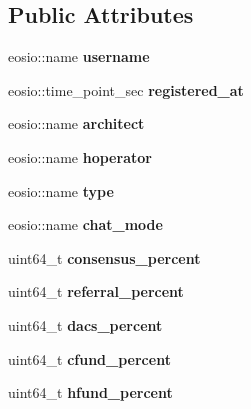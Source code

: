 \subsection*{Public Attributes}
\begin{DoxyCompactItemize}
\item 
\mbox{\label{structhosts_a20938bba05a37320a8875a506d1d2ad1}} 
eosio\+::name {\bfseries username}
\item 
\mbox{\label{structhosts_acd94c0fd8841fa120966a7ed2ede2e99}} 
eosio\+::time\+\_\+point\+\_\+sec {\bfseries registered\+\_\+at}
\item 
\mbox{\label{structhosts_a7bbcbedf69f3a70bee5dca8da4f0f299}} 
eosio\+::name {\bfseries architect}
\item 
\mbox{\label{structhosts_ae597139b6e779b34e63f5c0a78bd2675}} 
eosio\+::name {\bfseries hoperator}
\item 
\mbox{\label{structhosts_a5d51b449fc6701419c2e06b6045e1c79}} 
eosio\+::name {\bfseries type}
\item 
\mbox{\label{structhosts_a7654231d14b15269cf881e0e181b041c}} 
eosio\+::name {\bfseries chat\+\_\+mode}
\item 
\mbox{\label{structhosts_a6fb16cf97e6aa242fa89eeb4b7c5e70b}} 
uint64\+\_\+t {\bfseries consensus\+\_\+percent}
\item 
\mbox{\label{structhosts_a3cd22dae2f7d51f9e30ae3d3d5222c92}} 
uint64\+\_\+t {\bfseries referral\+\_\+percent}
\item 
\mbox{\label{structhosts_a4042ea164fa4913cfb00eeba3f237770}} 
uint64\+\_\+t {\bfseries dacs\+\_\+percent}
\item 
\mbox{\label{structhosts_a5b1777c0a1e69811b2eb17830f65d73b}} 
uint64\+\_\+t {\bfseries cfund\+\_\+percent}
\item 
\mbox{\label{structhosts_adccbeedcff76e76d268dd5309c62d306}} 
uint64\+\_\+t {\bfseries hfund\+\_\+percent}
\item 

\end{DoxyCompactItemize}
